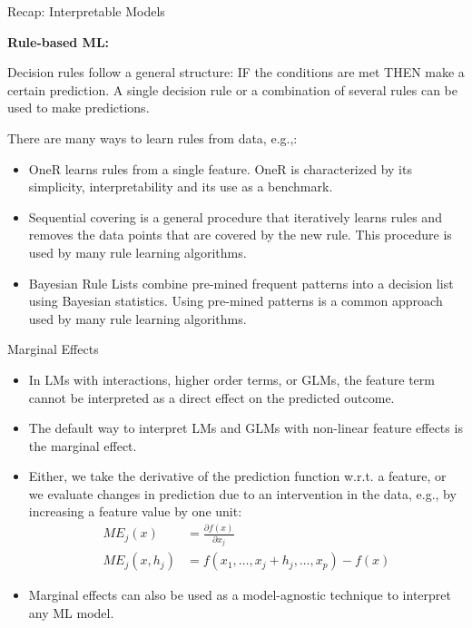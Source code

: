 \documentclass[11pt,compress,t,notes=noshow, xcolor=table]{beamer}
\begin{document}
\begin{vbframe}{Recap: Interpretable Models}


\textbf{Rule-based ML:}


Decision rules follow a general structure: IF the conditions are met THEN make a certain prediction. A single decision rule or a combination of several rules can be used to make predictions.

\vspace{0.5cm}
There are many ways to learn rules from data, e.g.,:
\begin{itemize}
\item OneR learns rules from a single feature. OneR is characterized by its simplicity, interpretability and its use as a benchmark.
\item Sequential covering is a general procedure that iteratively learns rules and removes the data points that are covered by the new rule. This procedure is used by many rule learning algorithms.
\item Bayesian Rule Lists combine pre-mined frequent patterns into a decision list using Bayesian statistics. Using pre-mined patterns is a common approach used by many rule learning algorithms.
\end{itemize}

\end{vbframe}

\begin{vbframe}{Marginal Effects}

\begin{itemize}
\item In LMs with interactions, higher order terms, or GLMs, the feature term cannot be interpreted as a direct effect on the predicted outcome.
\item The default way to interpret LMs and GLMs with non-linear feature effects is the marginal effect.
\item Either, we take the derivative of the prediction function w.r.t. a feature, or we evaluate changes in prediction due to an intervention in the data, e.g., by increasing a feature value by one unit:
\begin{align*}
ME_j(x) &= \frac{\partial f(x)}{\partial x_j} \\
ME_j(x, h_j) &= f(x_1, \dots, x_j + h_j, \dots, x_p) - f(x)
\end{align*}
\item Marginal effects can also be used as a model-agnostic technique to interpret any ML model.
\end{itemize}

\end{vbframe}
\end{document}
